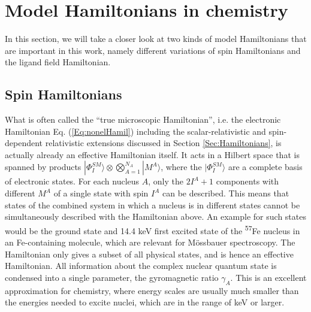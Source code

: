 \section{Model Hamiltonians in chemistry}

In this section, we will take a closer look at two kinds of model Hamiltonians that are important in this work, namely different variations of spin Hamiltonians and the ligand field Hamiltonian.

\subsection{Spin Hamiltonians}
What is often called the ``true microscopic Hamiltonian'', i.e. the electronic Hamiltonian Eq. (\ref{Eq:nonelHamil}) including the scalar-relativistic and spin-dependent relativistic extensions discussed in Section \ref{Sec:Hamiltonians}, is actually already an effective Hamiltonian itself. It acts in a Hilbert space that is spanned by products $|\Phi_I^{SM}\rangle\otimes \bigotimes_{A=1}^{N_A}|M^A\rangle$, where the $|\Phi_I^{SM}\rangle$ are a complete basis of electronic states. For each nucleus $A$, only the $2I^A+1$ components with different $M^A$ of a single state with spin $I^A$ can be described. This means that states of the combined system in which a nucleus is in different states cannot be simultaneously described with the Hamiltonian above. An example for such states would be the ground state and 14.4 keV first excited state of the  \textsuperscript{57}Fe nucleus in an Fe-containing molecule, which are relevant for Mössbauer spectroscopy. The Hamiltonian only gives a subset of all physical states, and is hence an effective Hamiltonian. All information about the complex nuclear quantum state is condensed into a single parameter, the gyromagnetic ratio $\gamma_A$. This is an excellent approximation for chemistry, where energy scales are usually much smaller than the energies needed to excite nuclei, which are in the range of keV or larger.

